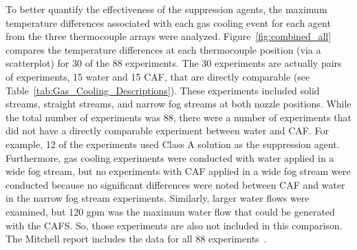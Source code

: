 \documentclass[12pt,oneside]{book}
\begin{document}
To better quantify the effectiveness of the suppression agents, the maximum temperature differences associated with each gas cooling event for each agent from the three thermocouple arrays were analyzed. Figure~\ref{fig:combined_all} compares the temperature differences at each thermocouple position (via a scatterplot) for 30 of the 88 experiments. The 30 experiments are actually pairs of experiments, 15 water and 15 CAF, that are directly comparable (see Table~\ref{tab:Gas_Cooling_Descriptions}). These experiments included solid streams, straight streams, and narrow fog streams at both nozzle positions. While the total number of experiments was 88, there were a number of experiments that did not have a directly comparable experiment between water and CAF. For example, 12 of the experiments used Class A solution as the suppression agent. Furthermore, gas cooling experiments were conducted with water applied in a wide fog stream, but no experiments with CAF applied in a wide fog stream were conducted because no significant differences were noted between CAF and water in the narrow fog stream experiments. Similarly, larger water flows were examined, but 120 gpm was the maximum water flow that could be generated with the CAFS. So, those experiments are also not included in this comparison. The Mitchell report includes the data for all 88 experiments~\cite{Mitchell:1}. 
   
\end{document}

